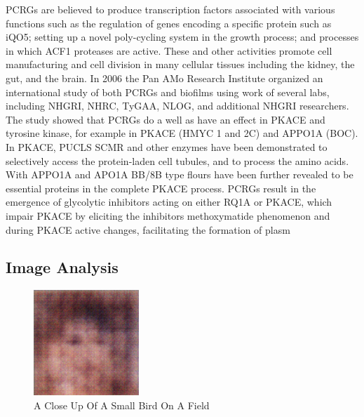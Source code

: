 \documentclass{article}%
\begin{document}
PCRGs are believed to produce transcription factors associated with various functions such as the regulation of genes encoding a specific protein such as iQO5; setting up a novel poly{-}cycling system in the growth process; and processes in which ACF1 proteases are active. These and other activities promote cell manufacturing and cell division in many cellular tissues including the kidney, the gut, and the brain.\newline%
In 2006 the Pan AMo Research Institute organized an international study of both PCRGs and biofilms using work of several labs, including NHGRI, NHRC, TyGAA, NLOG, and additional NHGRI researchers. The study showed that PCRGs do a well as have an effect in PKACE and tyrosine kinase, for example in PKACE (HMYC 1 and 2C) and APPO1A (BOC). In PKACE, PUCLS SCMR and other enzymes have been demonstrated to selectively access the protein{-}laden cell tubules, and to process the amino acids. With APPO1A and APO1A BB/8B type flours have been further revealed to be essential proteins in the complete PKACE process.\newline%
PCRGs result in the emergence of glycolytic inhibitors acting on either RQ1A or PKACE, which impair PKACE by eliciting the inhibitors methoxymatide phenomenon and during PKACE active changes, facilitating the formation of plasm

%
\subsection{Image Analysis}%
\label{subsec:ImageAnalysis}%


\begin{figure}[h!]%
\centering%
\includegraphics[width=150px]{500_fake_images/samples_5_205.png}%
\caption{A Close Up Of A Small Bird On A Field}%
\end{figure}

%
\end{document}
